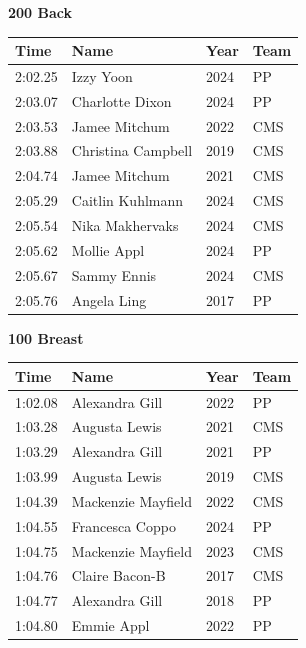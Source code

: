 \vspace{1.2em}
\noindent\begin{minipage}[t]{0.98\textwidth}
\centering
\textbf{\textcolor{teamprimary}{200 Back}}\par
\vspace{0.5em}
\centering
\small
\renewcommand{\arraystretch}{1.0}
\setlength{\tabcolsep}{4pt}
\begin{tabular}{@{}p{2.5cm}p{4.5cm}p{1.5cm}p{2.5cm}@{}}
\toprule
\textbf{Time} & \textbf{Name} & \textbf{Year} & \textbf{Team} \\
\midrule
2:02.25 & Izzy Yoon & 2024 & PP \\
2:03.07 & Charlotte Dixon & 2024 & PP \\
2:03.53 & Jamee Mitchum & 2022 & CMS \\
2:03.88 & Christina Campbell & 2019 & CMS \\
2:04.74 & Jamee Mitchum & 2021 & CMS \\
2:05.29 & Caitlin Kuhlmann & 2024 & CMS \\
2:05.54 & Nika Makhervaks & 2024 & CMS \\
2:05.62 & Mollie Appl & 2024 & PP \\
2:05.67 & Sammy Ennis & 2024 & CMS \\
2:05.76 & Angela Ling & 2017 & PP \\
\bottomrule
\end{tabular}
\end{minipage}
\vspace{1.2em}
\noindent\begin{minipage}[t]{0.98\textwidth}
\centering
\textbf{\textcolor{teamprimary}{100 Breast}}\par
\vspace{0.5em}
\centering
\small
\renewcommand{\arraystretch}{1.0}
\setlength{\tabcolsep}{4pt}
\begin{tabular}{@{}p{2.5cm}p{4.5cm}p{1.5cm}p{2.5cm}@{}}
\toprule
\textbf{Time} & \textbf{Name} & \textbf{Year} & \textbf{Team} \\
\midrule
1:02.08 & Alexandra Gill & 2022 & PP \\
1:03.28 & Augusta Lewis & 2021 & CMS \\
1:03.29 & Alexandra Gill & 2021 & PP \\
1:03.99 & Augusta Lewis & 2019 & CMS \\
1:04.39 & Mackenzie Mayfield & 2022 & CMS \\
1:04.55 & Francesca Coppo & 2024 & PP \\
1:04.75 & Mackenzie Mayfield & 2023 & CMS \\
1:04.76 & Claire Bacon-B & 2017 & CMS \\
1:04.77 & Alexandra Gill & 2018 & PP \\
1:04.80 & Emmie Appl & 2022 & PP \\
\bottomrule
\end{tabular}
\end{minipage}
